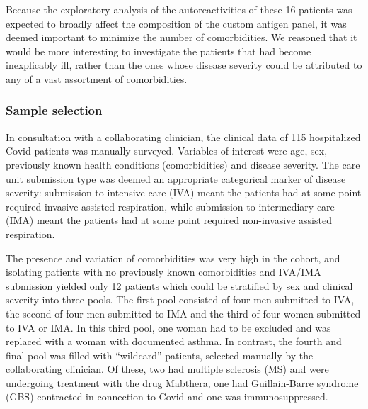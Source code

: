 \documentclass{article}
\begin{document}
Because the exploratory analysis of the autoreactivities of these 16 patients was expected to broadly affect the composition of the custom antigen panel, it was deemed important to minimize the number of comorbidities.  We reasoned that it would be more interesting to investigate the patients that had become inexplicably ill, rather than the ones whose disease severity could be attributed to any of a vast assortment of comorbidities.

\subsubsection{Sample selection}
In consultation with a collaborating clinician, the clinical data of 115 hospitalized Covid patients was manually surveyed. Variables of interest were age, sex, previously known health conditions (comorbidities) and disease severity. The care unit submission type was deemed an appropriate categorical marker of disease severity: submission to intensive care (IVA) meant the patients had at some point required invasive assisted respiration, while submission to intermediary care (IMA) meant the patients had at some point required non-invasive assisted respiration.

The presence and variation of comorbidities was very high in the cohort, and isolating patients with no previously known comorbidities and IVA/IMA submission yielded only 12 patients which could be stratified by sex and clinical severity into three pools. The first pool consisted of four men submitted to IVA, the second of four men submitted to IMA and the third of four women submitted to IVA or IMA. In this third pool, one woman had to be excluded and was replaced with a woman with documented asthma. In contrast, the fourth and final pool was filled with “wildcard” patients, selected manually by the collaborating clinician. Of these, two had multiple sclerosis (MS) and were undergoing treatment with the drug Mabthera, one had Guillain-Barre syndrome (GBS) contracted in connection to Covid and one was immunosuppressed.
\end{document}
